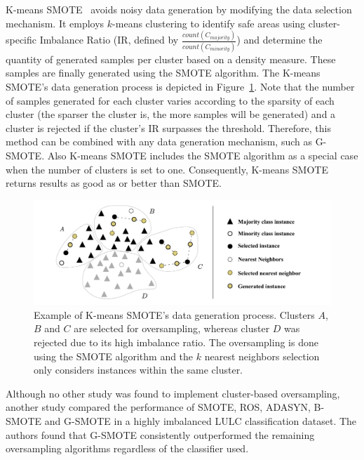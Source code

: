 \documentclass[preprint,12pt]{elsarticle}
\begin{document}
K-means SMOTE~\cite{Douzas2018} avoids noisy data
generation by modifying the data selection mechanism. It employs $k$-means
clustering to identify safe areas using cluster-specific Imbalance Ratio
(IR, defined by $\frac{count(C_{majority})}{count(C_{minority})}$) and
determine the quantity of generated samples per cluster based on a density
measure. These samples are finally generated using the SMOTE algorithm. The
K-means SMOTE's data generation process is depicted in
Figure~\ref{fig:kmeans_smote_example}. Note that the number of samples
generated for each cluster varies according to the sparsity of each cluster
(the sparser the cluster is, the more samples will be generated) and a cluster
is rejected if the cluster's IR surpasses the threshold.  Therefore, this
method can be combined with any data generation mechanism, such as G-SMOTE.
Also K-means SMOTE includes the SMOTE algorithm as a
special case when the number of clusters is set to one. Consequently,
K-means SMOTE returns
results as good as or better than SMOTE.

\begin{figure}[H]
	\centering
    \captionsetup{justification=centering}
    \caption{Example of K-means SMOTE's data generation
        process. Clusters $A$, $B$ and $C$ are selected for oversampling,
        whereas cluster $D$ was rejected due to its high imbalance ratio. The
        oversampling is done using the SMOTE algorithm and the $k$ nearest
        neighbors selection only considers instances
        within the same cluster.
    \vspace{.2cm}}
	\label{fig:kmeans_smote_example}
	\includegraphics[width=1\linewidth]{../analysis/kmeans_smote_example}
\end{figure}

Although no other study was found to implement cluster-based oversampling,
another study \cite{Douzas2019rs} compared the performance of SMOTE, ROS,
ADASYN, B-SMOTE and G-SMOTE in a highly imbalanced LULC classification dataset.
The authors found that G-SMOTE consistently outperformed the remaining
oversampling algorithms regardless of the classifier used.
\end{document}
